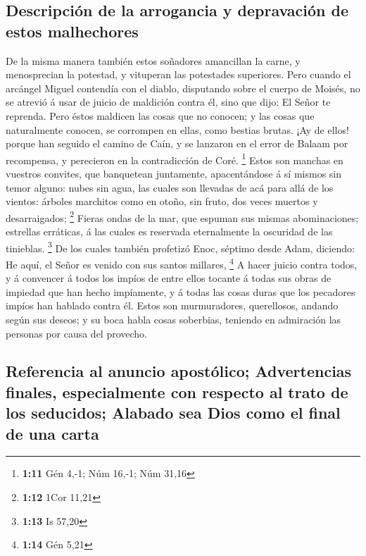 \hypertarget{descripciuxf3n-de-la-arrogancia-y-depravaciuxf3n-de-estos-malhechores}{%
\subsection{Descripción de la arrogancia y depravación de estos
malhechores}\label{descripciuxf3n-de-la-arrogancia-y-depravaciuxf3n-de-estos-malhechores}}

 De la misma manera también estos soñadores amancillan la
carne, y menosprecian la potestad, y vituperan las potestades
superiores.  Pero cuando el arcángel Miguel contendía con el
diablo, disputando sobre el cuerpo de Moisés, no se atrevió á usar de
juicio de maldición contra él, sino que dijo: El Señor te reprenda.
 Pero éstos maldicen las cosas que no conocen; y las cosas
que naturalmente conocen, se corrompen en ellas, como bestias brutas.
 ¡Ay de ellos! porque han seguido el camino de Caín, y se
lanzaron en el error de Balaam por recompensa, y perecieron en la
contradicción de Coré. \footnote{\textbf{1:11} Gén 4,-1; Núm 16,-1; Núm
  31,16}  Estos son manchas en vuestros convites, que
banquetean juntamente, apacentándose á sí mismos sin temor alguno: nubes
sin agua, las cuales son llevadas de acá para allá de los vientos:
árboles marchitos como en otoño, sin fruto, dos veces muertos y
desarraigados; \footnote{\textbf{1:12} 1Cor 11,21}  Fieras
ondas de la mar, que espuman sus mismas abominaciones; estrellas
erráticas, á las cuales es reservada eternalmente la oscuridad de las
tinieblas. \footnote{\textbf{1:13} Is 57,20}  De los cuales
también profetizó Enoc, séptimo desde Adam, diciendo: He aquí, el Señor
es venido con sus santos millares, \footnote{\textbf{1:14} Gén 5,21}
 A hacer juicio contra todos, y á convencer á todos los
impíos de entre ellos tocante á todas sus obras de impiedad que han
hecho impíamente, y á todas las cosas duras que los pecadores impíos han
hablado contra él.  Estos son murmuradores, querellosos,
andando según sus deseos; y su boca habla cosas soberbias, teniendo en
admiración las personas por causa del provecho.

\hypertarget{referencia-al-anuncio-apostuxf3lico-advertencias-finales-especialmente-con-respecto-al-trato-de-los-seducidos-alabado-sea-dios-como-el-final-de-una-carta}{%
\subsection{Referencia al anuncio apostólico; Advertencias finales,
especialmente con respecto al trato de los seducidos; Alabado sea Dios
como el final de una
carta}\label{referencia-al-anuncio-apostuxf3lico-advertencias-finales-especialmente-con-respecto-al-trato-de-los-seducidos-alabado-sea-dios-como-el-final-de-una-carta}}

